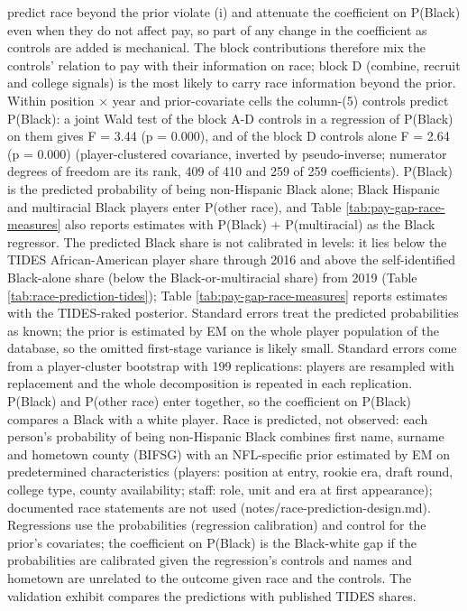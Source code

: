 \begin{table}[!h]
\begin{threeparttable}
\begin{tablenotes}[para]
predict race beyond the prior violate (i) and attenuate the coefficient on P(Black) even when they do not affect pay, so part of any change in the coefficient as controls are added is mechanical. The block contributions therefore mix the controls' relation to pay with their information on race; block D (combine, recruit and college signals) is the most likely to carry race information beyond the prior. Within position $\times$ year and prior-covariate cells the column-(5) controls predict P(Black): a joint Wald test of the block A-D controls in a regression of P(Black) on them gives F = 3.44 (p = 0.000), and of the block D controls alone F = 2.64 (p = 0.000) (player-clustered covariance, inverted by pseudo-inverse; numerator degrees of freedom are its rank, 409 of 410 and 259 of 259 coefficients). P(Black) is the predicted probability of being non-Hispanic Black alone; Black Hispanic and multiracial Black players enter P(other race), and Table \ref{tab:pay-gap-race-measures} also reports estimates with P(Black) + P(multiracial) as the Black regressor. The predicted Black share is not calibrated in levels: it lies below the TIDES African-American player share through 2016 and above the self-identified Black-alone share (below the Black-or-multiracial share) from 2019 (Table \ref{tab:race-prediction-tides}); Table \ref{tab:pay-gap-race-measures} reports estimates with the TIDES-raked posterior. Standard errors treat the predicted probabilities as known; the prior is estimated by EM on the whole player population of the database, so the omitted first-stage variance is likely small. Standard errors come from a player-cluster bootstrap with 199 replications: players are resampled with replacement and the whole decomposition is repeated in each replication. P(Black) and P(other race) enter together, so the coefficient on P(Black) compares a Black with a white player. Race is predicted, not observed: each person's probability of being non-Hispanic Black combines first name, surname and hometown county (BIFSG) with an NFL-specific prior estimated by EM on predetermined characteristics (players: position at entry, rookie era, draft round, college type, county availability; staff: role, unit and era at first appearance); documented race statements are not used (notes/race-prediction-design.md). Regressions use the probabilities (regression calibration) and control for the prior's covariates; the coefficient on P(Black) is the Black-white gap if the probabilities are calibrated given the regression's controls and names and hometown are unrelated to the outcome given race and the controls. The validation exhibit compares the predictions with published TIDES shares.
\end{tablenotes}
\end{threeparttable}
\end{table}
